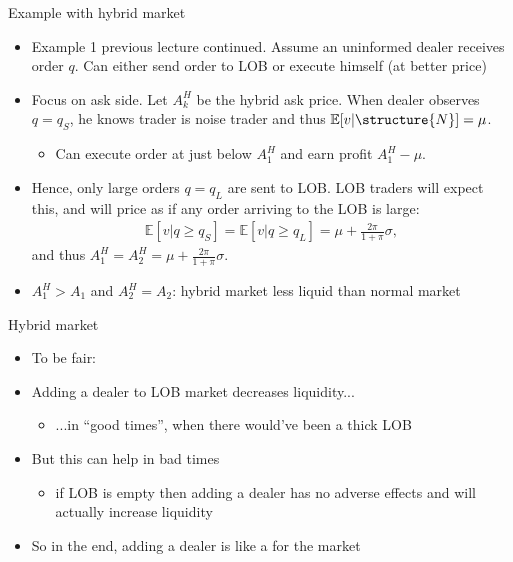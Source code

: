 \documentclass[english,10pt
,aspectratio=169
]{beamer}
\begin{document}
\begin{frame}{Example with hybrid market}
	\begin{itemize}
		\item Example 1 previous lecture continued. Assume an uninformed dealer receives order $q$. Can either send order to LOB or execute himself (at better price) 
		\pause
		\item Focus on ask side. Let $A^H_k$ be the hybrid ask price. When dealer observes $q=q_S$, he knows trader is noise trader and thus $\mathbb{E}[v|\structure{N}]=\mu$. 
		\begin{itemize}
			\item Can execute order at just below $A^H_1$ and earn profit $A^H_1-\mu$.
		\end{itemize}
		\pause
		\item Hence, only large orders $q=q_L$ are sent to LOB. LOB traders will expect this, and will price as if any order arriving to the LOB is large:
		\begin{align*}
		\mathbb{E}[v|q \ge q_S]=\mathbb{E}[v|q \ge q_L]=\mu+\frac{2\pi}{1+\pi} \sigma,
		\end{align*}
		and thus $A^H_1=A^H_2=\mu+\frac{2\pi}{1+\pi} \sigma$.
		\item $A^H_1>A_1$ and $A^H_2=A_2$: hybrid market less liquid than normal market
	\end{itemize}
\end{frame}


\begin{frame}{Hybrid market}
	\begin{itemize}
		\item To be fair:
		\item Adding a dealer to LOB market decreases liquidity...
		\begin{itemize}
			\item ...in ``good times'', when there would've been a thick LOB
		\end{itemize}
		\item But this can help in bad times
		\begin{itemize}
			\item if LOB is empty then adding a dealer has no adverse effects and will actually increase liquidity
		\end{itemize}
		\item So in the end, adding a dealer is like a  for the market
	\end{itemize}
\end{frame}
\end{document}
